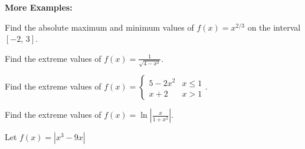 \documentclass[addpoints, 12pt]{exam}
\begin{document}
\newpage

\noindent\textbf{More Examples:}
\begin{questions}
    \question Find the absolute maximum and minimum values of $f(x)=x^{2/3}$ on the interval $[-2,\,3]$.
    
    \question Find the extreme values of  $\displaystyle f(x)=\frac{1}{\sqrt{4-x^2}}$.
    
    \question Find the extreme values of $\displaystyle f(x)=\begin{cases}
    5-2x^2 & x\le1\\ x+2 & x>1
    \end{cases}$.
    
    \question Find the extreme values of $\displaystyle f(x)=\ln\left|\frac{x}{1+x^2}\right|$.
    
    \question Let $f(x)=|x^3-9x|$
\end{questions}

\newpage
\end{document}

